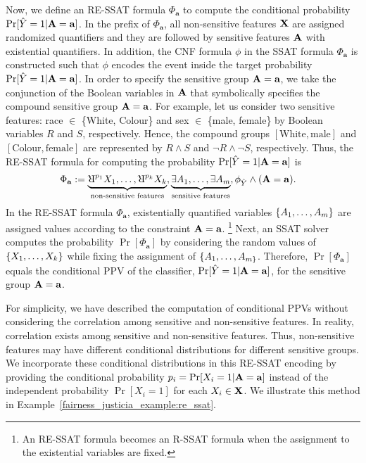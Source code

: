 Now, we define an RE-SSAT formula $\Phi_{\mathbf{a}}$ to compute the conditional probability $\Pr[\hat{Y} = 1 | \mathbf{A} = \mathbf{a}]$. In the prefix of $ \Phi_{\mathbf{a}} $,  all non-sensitive features $ \mathbf{X} $ are assigned randomized quantifiers and they are followed by sensitive features $ \mathbf{A} $ with existential quantifiers.  In addition, the CNF formula $ \phi $ in the SSAT formula $ \Phi_{\mathbf{a}} $ is constructed such that $ \phi $ encodes the event inside the target probability $ \Pr[\hat{Y} = 1 | \mathbf{A} = \mathbf{a}] $. In order to specify the sensitive group $ \mathbf{A} = \mathbf{a} $, we take the conjunction of the Boolean variables in $ \mathbf{A} $ that symbolically specifies the compound sensitive group $ \mathbf{A} = \mathbf{a} $. For example, let us consider two sensitive features: race $ \in $ \{White, Colour\} and sex $ \in $ \{male, female\} by Boolean variables $ R $ and $ S $,  respectively. Hence, the compound groups $ [\textrm{White}, \textrm{male}] $ and $[\textrm{Colour}, \textrm{female}]$ are represented by $ R \wedge S $ and $ \neg R \wedge \neg S $, respectively. Thus, the RE-SSAT formula for computing the probability  $ \Pr[\hat{Y} = 1 | \mathbf{A} = \mathbf{a}] $ is
\begin{equation}	\label{fairness_justicia_eq:re}
\begin{split}
	\Phi_{\mathbf{a}} := \underbrace{\R^{p_{1}}X_1, \dots, \R^{p_{\numnonsensitive}}X_{\numnonsensitive}}_{\text{non-sensitive features}},  &\underbrace{\exists A_1,\dots, \exists A_{\numsensitive}}_{\text{sensitive features}},
\phi_{\hat{Y}} \wedge (\sensitive =\mathbf{a}).\notag
\end{split}
\end{equation}
In the RE-SSAT formula $ \Phi_{\mathbf{a}} $, existentially quantified variables  $ \{A_1, \dots, A_{m}\} $ are assigned values  according  to the constraint $ \mathbf{A} =\mathbf{a} $. \footnote{An RE-SSAT formula becomes an R-SSAT formula when the assignment to the existential variables are fixed.} Next,  an SSAT solver computes the probability $ \Pr[\Phi_{\mathbf{a}}] $ by considering the random values of $ \{X_1, \dots, X_{k}\} $ while fixing the assignment of $ \{A_1, \dots, A_{m\}} $. Therefore, $ \Pr[\Phi_{\mathbf{a}}] $ equals the conditional PPV of the classifier, $ \Pr[\hat{Y} = 1 | \mathbf{A} = \mathbf{a}] $, for the sensitive group $ \mathbf{A} = \mathbf{a} $. 

For simplicity, we have described the computation of conditional PPVs without considering the correlation among sensitive and non-sensitive features. In reality, correlation exists among sensitive and non-sensitive features. Thus, non-sensitive features may have different conditional distributions for different sensitive groups. We incorporate these conditional distributions in this RE-SSAT encoding by providing the conditional probability $ p_i = \Pr[X_i = 1| \mathbf{A} =\mathbf{a}] $ instead of the independent probability $\Pr[X_i = 1]$ for each $X_i\in \mathbf{X}$. We illustrate this method in Example~\ref{fairness_justicia_example:re_ssat}.

